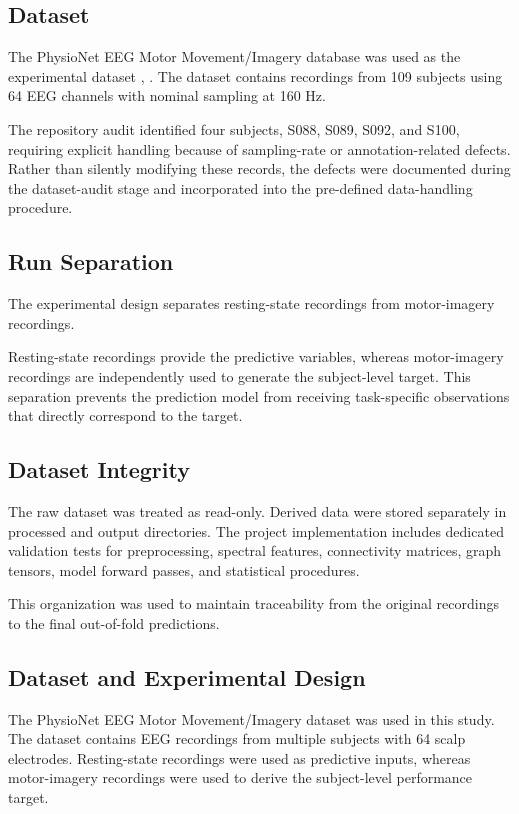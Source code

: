 \documentclass[conference]{IEEEtran}
\begin{document}
\subsection{Dataset}
The PhysioNet EEG Motor Movement/Imagery database was used as the experimental dataset \cite{goldberger2000}, \cite{schalk2004}. The dataset contains recordings from 109 subjects using 64 EEG channels with nominal sampling at 160 Hz.

The repository audit identified four subjects, S088, S089, S092, and S100, requiring explicit handling because of sampling-rate or annotation-related defects. Rather than silently modifying these records, the defects were documented during the dataset-audit stage and incorporated into the pre-defined data-handling procedure.

\subsection{Run Separation}
The experimental design separates resting-state recordings from motor-imagery recordings.

Resting-state recordings provide the predictive variables, whereas motor-imagery recordings are independently used to generate the subject-level target. This separation prevents the prediction model from receiving task-specific observations that directly correspond to the target.

\subsection{Dataset Integrity}
The raw dataset was treated as read-only. Derived data were stored separately in processed and output directories. The project implementation includes dedicated validation tests for preprocessing, spectral features, connectivity matrices, graph tensors, model forward passes, and statistical procedures.

This organization was used to maintain traceability from the original recordings to the final out-of-fold predictions.

\subsection{Dataset and Experimental Design}
The PhysioNet EEG Motor Movement/Imagery dataset was used in this study. The dataset contains EEG recordings from multiple subjects with 64 scalp electrodes. Resting-state recordings were used as predictive inputs, whereas motor-imagery recordings were used to derive the subject-level performance target.
\end{document}

